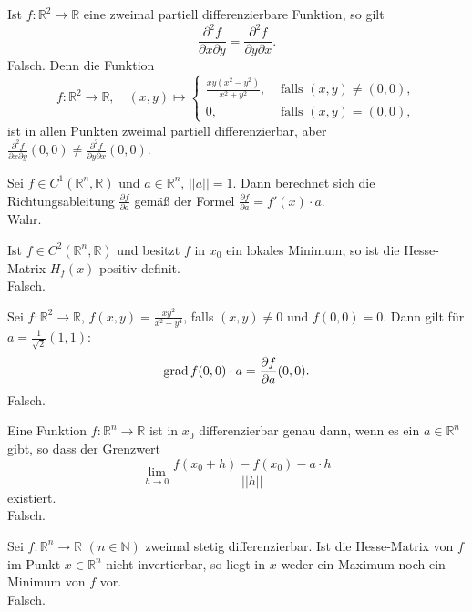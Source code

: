 Ist $f : \mathbb{R}^2 \to \mathbb{R}$ eine zweimal partiell differenzierbare Funktion, so gilt
\begin{displaymath}
  \frac{\partial^2 f}{\partial x \partial y} = \frac{\partial^2 f}{\partial y \partial x}.
\end{displaymath}
Falsch.
Denn die Funktion
\begin{displaymath}
  f : \mathbb{R}^2 \to \mathbb{R}, \quad (x,y) \mapsto
  \begin{cases}
    \frac{xy(x^2 - y^2)}{x^2 + y^2},& \text{ falls } (x,y) \neq (0,0),\\
    0,& \text{ falls } (x,y) = (0,0),
  \end{cases}
\end{displaymath}
ist in allen Punkten zweimal partiell differenzierbar, aber $\frac{\partial^2 f}{\partial x \partial y}(0,0) \neq \frac{\partial^2 f}{\partial y \partial x}(0,0)$.

Sei $f \in C^1(\mathbb{R}^n, \mathbb{R})$ und $a \in \mathbb{R}^n$, $||a|| = 1$.
Dann berechnet sich die Richtungsableitung $\frac{\partial f}{\partial a}$ gemäß der Formel $\frac{\partial f}{\partial a} = f'(x) \cdot a$.\\
Wahr.

Ist $f \in C^2(\mathbb{R}^n, \mathbb{R})$ und besitzt $f$ in $x_0$ ein lokales Minimum, so ist die Hesse-Matrix $H_f(x)$ positiv definit.\\
Falsch.

Sei $f : \mathbb{R}^2 \to \mathbb{R}$, $f(x,y) = \frac{xy^2}{x^2 + y^4}$, falls $(x,y) \neq 0$ und $f(0,0) = 0$.
Dann gilt für $a = \frac{1}{\sqrt{2}}(1,1)$:
\begin{displaymath}
  \operatorname{grad} f(0,0) \cdot a = \frac{\partial f}{\partial a}(0,0).
\end{displaymath}
Falsch.

Eine Funktion $f : \mathbb{R}^n \to \mathbb{R}$ ist in $x_0$ differenzierbar genau dann, wenn es ein $a \in \mathbb{R}^n$ gibt, so dass der Grenzwert
\begin{displaymath}
  \lim_{h \to 0} \frac{f(x_0 + h) - f(x_0) - a \cdot h}{||h||}
\end{displaymath}
existiert.\\
Falsch.

Sei $f : \mathbb{R}^n \to \mathbb{R}$ $(n \in \mathbb{N})$ zweimal stetig differenzierbar.
Ist die Hesse-Matrix von $f$ im Punkt $x \in \mathbb{R}^n$ nicht invertierbar, so liegt in $x$ weder ein Maximum noch ein Minimum von $f$ vor.\\
Falsch.

